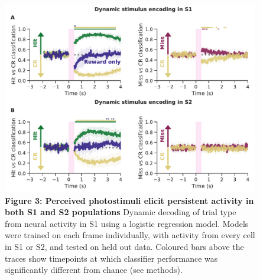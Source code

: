\begin{figure}[h]
\hspace*{-0.6in}
\includegraphics[scale=0.45]{figures/Figure3.pdf}
\caption[\textbf{Perceived photostimuli elicit persistent activity in both S1 and S2 populations
}]{\textbf{Figure 3: Perceived photostimuli elicit persistent activity in both S1 and S2 populations} Dynamic decoding of trial type from neural activity in S1 using a logistic regression model. Models were trained on each frame individually, with activity from every cell in S1 or S2, and tested on held out data. Coloured bars above the traces show timepoints at which classifier performance was significantly different from chance (see methods).
}
\end{figure}
